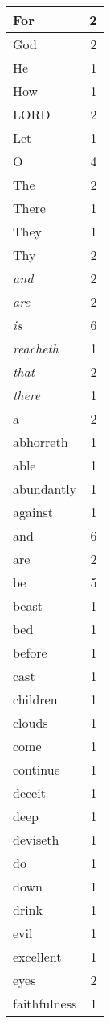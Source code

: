 \begin{center}
\begin{longtable}{l|r}
\hline \hline
\endlastfoot
For & 2 \\ \hline
God & 2 \\ \hline
He & 1 \\ \hline
How & 1 \\ \hline
LORD & 2 \\ \hline
Let & 1 \\ \hline
O & 4 \\ \hline
The & 2 \\ \hline
There & 1 \\ \hline
They & 1 \\ \hline
Thy & 2 \\ \hline
\emph{and} & 2 \\ \hline
\emph{are} & 2 \\ \hline
\emph{is} & 6 \\ \hline
\emph{reacheth} & 1 \\ \hline
\emph{that} & 2 \\ \hline
\emph{there} & 1 \\ \hline
a & 2 \\ \hline
abhorreth & 1 \\ \hline
able & 1 \\ \hline
abundantly & 1 \\ \hline
against & 1 \\ \hline
and & 6 \\ \hline
are & 2 \\ \hline
be & 5 \\ \hline
beast & 1 \\ \hline
bed & 1 \\ \hline
before & 1 \\ \hline
cast & 1 \\ \hline
children & 1 \\ \hline
clouds & 1 \\ \hline
come & 1 \\ \hline
continue & 1 \\ \hline
deceit & 1 \\ \hline
deep & 1 \\ \hline
deviseth & 1 \\ \hline
do & 1 \\ \hline
down & 1 \\ \hline
drink & 1 \\ \hline
evil & 1 \\ \hline
excellent & 1 \\ \hline
eyes & 2 \\ \hline
faithfulness & 1 \\ \hline

\end{longtable}
\end{center}
